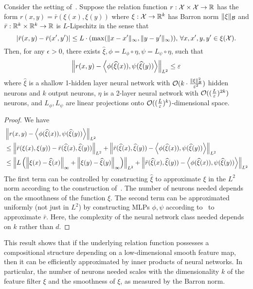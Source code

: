 \begin{corollary}
    Consider the setting of~. Suppose the relation function $r: {\mathcal{X}} \times {\mathcal{X}} \to \mathbb{R}$ has the form $r(x, y) = \bar{r}(\xi(x), \xi(y))$ where $\xi: {\mathcal{X}} \to \mathbb{R}^k$ has Barron norm $\lVert\xi\rVert_{\mathcal{B}}$ and $\bar{r}: \mathbb{R}^k \times \mathbb{R}^k \to \mathbb{R}$ is $L$-Lipschitz in the sense that $$\lvert\bar{r}(x, y) - \bar{r}(x', y')\rvert \leq L \cdot (\max(\lVert x - x'\rVert_\infty, \lVert y - y'\rVert_\infty)), \, \forall x,x',y,y' \in \xi({\mathcal{X}}).$$ Then, for any $\epsilon > 0$, there exists $\hat{\xi}, \phi = L_\phi \circ \eta, \psi = L_\psi \circ \eta$, such that
    \[\left\lVert r(x, y) - \left \langle \phi(\widehat{\xi}(x)), \psi(\widehat{\xi}(y)) \right\rangle\right\rVert_{L^2} \leq \varepsilon\]
    where $\hat{\xi}$ is a shallow 1-hidden layer neural network with ${\mathcal{O}}(k \cdot \frac{\lVert\xi\rVert_{{\mathcal{B}}}^2}{\varepsilon^2})$ hidden neurons and $k$ output neurons, $\eta$ is a 2-layer neural network with ${\mathcal{O}}((\frac{L}{\varepsilon})^{2 k})$ neurons, and $L_\phi, L_\psi$ are linear projections onto ${\mathcal{O}}((\frac{L}{\varepsilon})^{k})$-dimensional space.
\end{corollary}
\begin{proof}
    We have
    \begin{align*}
        &\left\lVert r(x, y) - \left \langle \phi(\widehat{\xi}(x)), \psi(\widehat{\xi}(y)) \right\rangle\right\rVert_{L^2} \\
        &\leq \left\lVert\bar{r}(\xi(x), \xi(y)) - \bar{r}(\widehat{\xi}(x), \widehat{\xi}(y))\right\rVert_{L^2} + \left\lVert\bar{r}(\widehat{\xi}(x), \widehat{\xi}(y)) - \left \langle \phi(\widehat{\xi}(x)), \psi(\widehat{\xi}(y)) \right\rangle\right\rVert_{L^2} \\
        &\leq \left\lVert L \left(\left\lVert\xi(x) - \widehat{\xi}(x)\right\rVert_{\infty} + \left\lVert\xi(y) - \widehat{\xi}(y)\right\rVert_{\infty}\right)\right\rVert_{L^2} + \left\lVert\bar{r}(\widehat{\xi}(x), \widehat{\xi}(y)) - \left \langle \phi(\widehat{\xi}(x)), \psi(\widehat{\xi}(y)) \right\rangle\right\rVert_{L^2}
    \end{align*}
    The first term can be controlled by constructing $\hat{\xi}$ to approximate $\xi$ in the $L^2$ norm according to the construction of~\textcite{barronUniversalApproximation1993}. The number of neurons needed depends on the smoothness of the function $\xi$. The second term can be approximated uniformly (not just in $L^2$) by constructing MLPs $\phi, \psi$ according to~ to approximate $\bar{r}$. Here, the complexity of the neural network class needed depends on $k$ rather than $d$.
\end{proof}

This result shows that if the underlying relation function possesses a compositional structure depending on a low-dimensional smooth feature map, then it can be efficiently approximated by inner products of neural networks. In particular, the number of neurons needed scales with the dimensionality $k$ of the feature filter $\xi$ and the smoothness of $\xi$, as measured by the Barron norm.